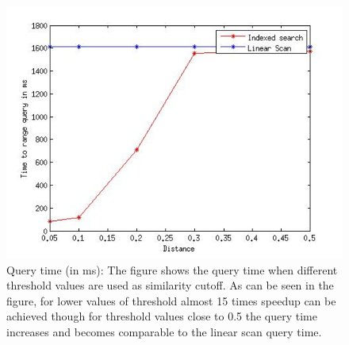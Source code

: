\begin{figure}[ht!]	
\centering
\includegraphics[width=0.35 \columnwidth]{img/query_time_100k_500p_100o_differentdist.jpg}
\caption{Query time (in ms): The figure shows the query time when different threshold values are used as similarity cutoff. As can be seen in the figure, for lower values of threshold almost 15 times speedup can be achieved though for threshold values close to 0.5 the query time increases and becomes comparable to the linear scan query time.}
\end{figure}
